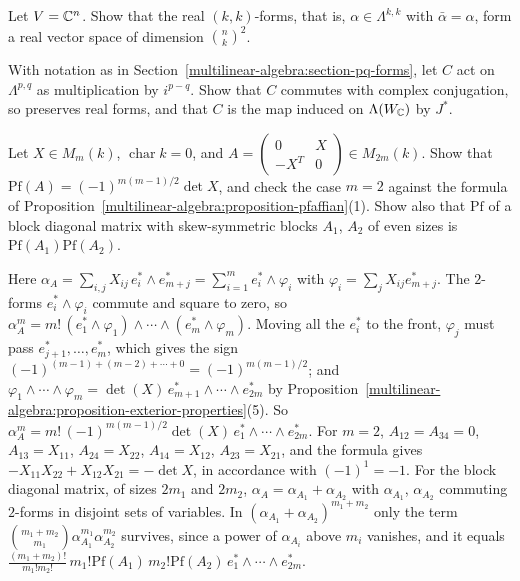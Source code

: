 \begin{exercise}\label{multilinear-algebra:exercise-pq-real-dimension}
Let $V = \mathbb{C}^n$. Show that the real $(k,k)$-forms, that is, $\alpha \in \Lambda^{k,k}$ with $\bar\alpha = \alpha$, form a real vector space
of dimension $\binom{n}{k}^2$.
\end{exercise}

\begin{exercise}\label{multilinear-algebra:exercise-weil-operator}
With notation as in Section~\ref{multilinear-algebra:section-pq-forms}, let $C$ act on $\Lambda^{p,q}$ as multiplication by
$i^{p-q}$. Show that $C$ commutes with complex conjugation, so preserves real forms, and that $C$ is the map
induced on $\Lambda(W_{\mathbb{C}})$ by $J^*$.
\end{exercise}

\begin{exercise}\label{multilinear-algebra:exercise-pfaffian-blocks}
Let $X \in M_m(k)$, $\operatorname{char}k = 0$, and $A = \begin{pmatrix} 0 & X\\ -X^T & 0\end{pmatrix} \in M_{2m}(k)$. Show that $\mathrm{Pf}(A) = (-1)^{m(m-1)/2}\det X$, and check the
case $m = 2$ against the formula of Proposition~\ref{multilinear-algebra:proposition-pfaffian}(1). Show also that $\mathrm{Pf}$ of a block diagonal matrix with skew-symmetric
blocks $A_1$, $A_2$ of even sizes is $\mathrm{Pf}(A_1)\mathrm{Pf}(A_2)$.
\end{exercise}

\begin{solution}
Here $\alpha_A = \sum_{i,j}X_{ij}\,e_i^* \wedge e_{m+j}^* = \sum_{i=1}^me_i^* \wedge \varphi_i$ with $\varphi_i = \sum_jX_{ij}e_{m+j}^*$. The $2$-forms $e_i^* \wedge \varphi_i$ commute and square
to zero, so $\alpha_A^m = m!\,(e_1^* \wedge \varphi_1) \wedge \cdots \wedge (e_m^* \wedge \varphi_m)$. Moving all the $e_i^*$ to the front, $\varphi_j$ must pass $e_{j+1}^*, \ldots, e_m^*$, which
gives the sign $(-1)^{(m-1) + (m-2) + \cdots + 0} = (-1)^{m(m-1)/2}$; and $\varphi_1 \wedge \cdots \wedge \varphi_m = \det(X)\,e_{m+1}^* \wedge \cdots \wedge e_{2m}^*$ by
Proposition~\ref{multilinear-algebra:proposition-exterior-properties}(5). So $\alpha_A^m = m!\,(-1)^{m(m-1)/2}\det(X)\,e_1^* \wedge \cdots \wedge e_{2m}^*$. For $m = 2$,
$A_{12} = A_{34} = 0$, $A_{13} = X_{11}$, $A_{24} = X_{22}$, $A_{14} = X_{12}$, $A_{23} = X_{21}$, and the formula gives $-X_{11}X_{22} + X_{12}X_{21} = -\det X$, in accordance with
$(-1)^{1} = -1$. For the block diagonal matrix, of sizes $2m_1$ and $2m_2$, $\alpha_A = \alpha_{A_1} + \alpha_{A_2}$ with $\alpha_{A_1}$, $\alpha_{A_2}$ commuting $2$-forms in disjoint sets of
variables. In $(\alpha_{A_1} + \alpha_{A_2})^{m_1 + m_2}$ only the term $\binom{m_1 + m_2}{m_1}\alpha_{A_1}^{m_1}\alpha_{A_2}^{m_2}$ survives, since a power of $\alpha_{A_i}$ above $m_i$ vanishes, and it equals
$\frac{(m_1 + m_2)!}{m_1!m_2!}\,m_1!\mathrm{Pf}(A_1)\,m_2!\mathrm{Pf}(A_2)\,e_1^* \wedge \cdots \wedge e_{2m}^*$.
\end{solution}
